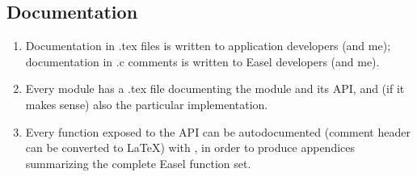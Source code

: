 \subsection{Documentation}

\begin{enumerate}
\item Documentation in .tex files is written to application developers
      (and me); documentation in .c comments is written to Easel
      developers (and me).

\item Every module has a .tex file documenting the module and its API,
      and (if it makes sense) also the particular implementation.

\item Every function exposed to the API can be autodocumented (comment
      header can be converted to \LaTeX) with
      , in order to produce appendices
      summarizing the complete Easel function set.
\end{enumerate}

